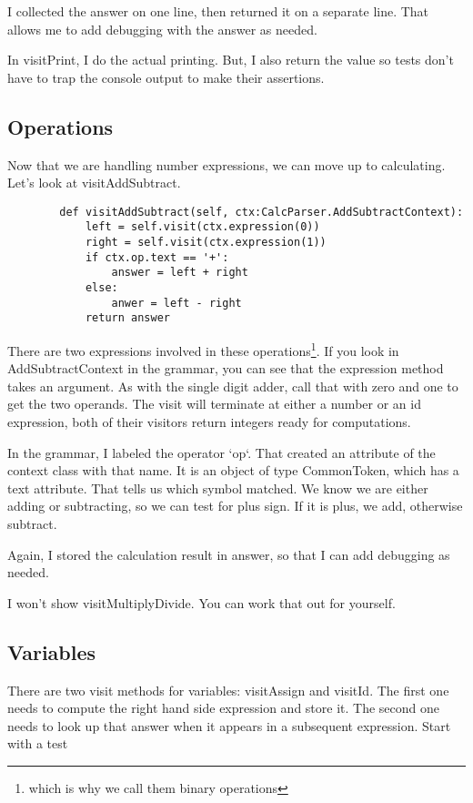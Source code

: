 I collected the answer on one line, then returned it on a separate line.
That allows me to add debugging with the answer as needed.

In visitPrint, I do the actual printing. But, I also return the value
so tests don't have to trap the console output to make their assertions.

\subsection{Operations}

Now that we are handling number expressions, we can move up to
calculating. Let's look at visitAddSubtract.

{\footnotesize
\begin{verbatim}
        def visitAddSubtract(self, ctx:CalcParser.AddSubtractContext):
            left = self.visit(ctx.expression(0))
            right = self.visit(ctx.expression(1))
            if ctx.op.text == '+':
                answer = left + right
            else:
                anwer = left - right
            return answer
\end{verbatim}
}

There are two expressions involved in these
operations\footnote{which is why we call them binary operations}.
If you look in AddSubtractContext in the grammar, you can see that
the expression method takes an argument. As with the single digit
adder, call that with zero and one to get the two operands.
The visit will terminate at either a number or an id expression,
both of their visitors return integers ready for computations.

In the grammar, I labeled the operator `op`. That created an attribute
of the context class with that name. It is an object of type
CommonToken, which has a text attribute. That tells us which symbol
matched. We know we are either adding or subtracting, so we can
test for plus sign. If it is plus, we add, otherwise subtract.

Again, I stored the calculation result in answer, so that I can
add debugging as needed.

I won't show visitMultiplyDivide. You can work that out for yourself.

\subsection{Variables}

There are two visit methods for variables: visitAssign and visitId.
The first one needs to compute the right hand side expression and
store it. The second one needs to look up that answer when it appears
in a subsequent expression. Start with a test

